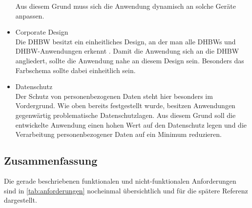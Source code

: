 \begin{itemize}
        Aus diesem Grund muss sich die Anwendung dynamisch an solche Geräte anpassen.
    \item Corporate Design\\
        Die DHBW besitzt ein einheitliches Design, an der man alle DHBWs und DHBW-Anwendungen erkennt \autocite{CD-DHBW}.
        Damit die Anwendung sich an die DHBW angliedert, sollte die Anwendung nahe an diesem Design sein.
        Besonders das Farbschema sollte dabei einheitlich sein. %
    \item Datenschutz\\
        Der Schutz von personenbezogenen Daten steht hier besonders im Vordergrund.
        Wie oben bereits festgestellt wurde, besitzen Anwendungen gegenwärtig problematische Datenschutzlagen.
        Aus diesem Grund soll die entwickelte Anwendung einen hohen Wert auf den Datenschutz legen und die Verarbeitung personenbezogener Daten auf ein Minimum reduzieren.
\end{itemize}



\subsection{Zusammenfassung}
Die gerade beschriebenen funktionalen und nicht-funktionalen Anforderungen sind in \autoref{tab:anforderungen} nocheinmal übersichtlich und für die spätere Referenz dargestellt.



